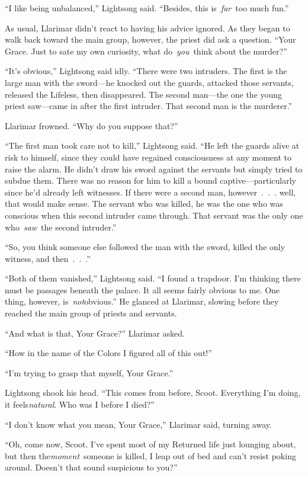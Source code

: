 “I like being unbalanced,” Lightsong said. “Besides, this is~\textit{far}~too much fun.”

As usual, Llarimar didn’t react to having his advice ignored. As they began to walk back toward the main group, however, the priest did ask a question. “Your Grace. Just to sate my own curiosity, what do~\textit{you}~think about the murder?”

“It’s obvious,” Lightsong said idly. “There were two intruders. The first is the large man with the sword—he knocked out the guards, attacked those servants, released the Lifeless, then disappeared. The second man—the one the young priest saw—came in after the first intruder. That second man is the murderer.”

Llarimar frowned. “Why do you suppose that?”

“The first man took care not to kill,” Lightsong said. “He left the guards alive at risk to himself, since they could have regained consciousness at any moment to raise the alarm. He didn’t draw his sword against the servants but simply tried to subdue them. There was no reason for him to kill a bound captive—particularly since he’d already left witnesses. If there were a second man, however~.~.~. well, that would make sense. The servant who was killed, he was the one who was conscious when this second intruder came through. That servant was the only one who~\textit{saw}~the second intruder.”

“So, you think someone else followed the man with the sword, killed the only witness, and then~.~.~.”

“Both of them vanished,” Lightsong said. “I found a trapdoor. I’m thinking there must be passages beneath the palace. It all seems fairly obvious to me. One thing, however, is~\textit{not}obvious.” He glanced at Llarimar, slowing before they reached the main group of priests and servants.

“And what is that, Your Grace?” Llarimar asked.

“How in the name of the Colors I figured all of this out!”

“I’m trying to grasp that myself, Your Grace.”

Lightsong shook his head. “This comes from before, Scoot. Everything I’m doing, it feels\textit{natural}. Who was I before I died?”

“I don’t know what you mean, Your Grace,” Llarimar said, turning away.

“Oh, come now, Scoot. I’ve spent most of my Returned life just lounging about, but then the\textit{moment}~someone is killed, I leap out of bed and can’t resist poking around. Doesn’t that sound suspicious to you?”

